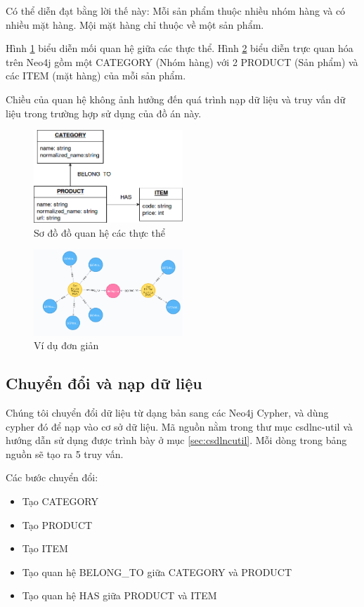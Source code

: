 Có thể diễn đạt bằng lời thế này: Mỗi sản phẩm thuộc nhiều nhóm hàng và có nhiều mặt hàng. Mội mặt hàng chỉ thuộc về một sản phẩm. 

Hình \ref{fig:datastructure} biểu diễn mối quan hệ giữa các thực thể. Hình \ref{fig:datastructureexample} biểu diễn trực quan hóa trên Neo4j gồm một CATEGORY (Nhóm hàng) với 2 PRODUCT (Sản phẩm) và các ITEM (mặt hàng) của mỗi sản phẩm.  

Chiều của quan hệ không ảnh hưởng đến quá trình nạp dữ liệu và truy vấn dữ liệu trong trường hợp sử dụng của đồ án này. 

\begin{figure}[h]
\centering
\includegraphics[width=0.5\textwidth]{image/neo4jdatastructure.png}
\caption{\label{fig:datastructure} Sơ đồ đồ quan hệ các thực thể}
\end{figure}


\begin{figure}[h]
\centering
\includegraphics[width=0.5\textwidth]{imagev2/vddatamodel.png}
\caption{\label{fig:datastructureexample} Ví dụ đơn giản}
\end{figure}


\subsection{Chuyển đổi và nạp dữ liệu}
Chúng tôi chuyển đổi dữ liệu từ dạng bản sang các Neo4j Cypher, và dùng cypher đó để nạp vào cơ sở dữ liệu. Mã nguồn nằm trong thư mục csdlnc-util và hướng dẫn sử dụng được trình bày ở mục \ref{sec:csdlncutil}. Mỗi dòng trong bảng nguồn sẽ tạo ra 5 truy vấn. 

Các bước chuyển đổi: 
\begin{itemize}
\item Tạo CATEGORY 
\item Tạo PRODUCT 
\item Tạo ITEM
\item Tạo quan hệ BELONG\_TO giữa CATEGORY và PRODUCT 
\item Tạo quan hệ HAS giữa PRODUCT và ITEM
\end{itemize}

